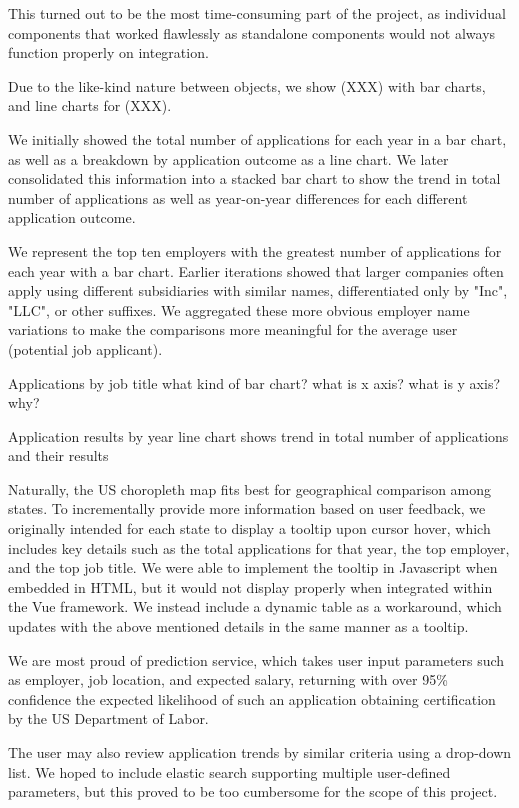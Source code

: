 \documentclass[sigconf]{acmart}
\begin{document}
This turned out to be the most time-consuming part of the project, as individual components that worked 
flawlessly as standalone components would not always function properly on integration. 


Due to the like-kind nature between objects, we show (XXX) with bar charts, and line charts for (XXX). 


We initially showed the total number of applications for each year in a bar chart, as well as a breakdown by application 
outcome as a line chart. We later consolidated this information into a stacked bar chart to show the trend in total number 
of applications as well as year-on-year differences for each different application outcome. 


We represent the top ten employers with the greatest number of applications for each year with a bar chart. 
Earlier iterations showed that larger companies often apply using different subsidiaries with similar names, 
differentiated only by "Inc", "LLC", or other suffixes. We aggregated these more obvious employer name variations 
to make the comparisons more meaningful for the average user (potential job applicant). 



Applications by job title 
what kind of bar chart? 
what is x axis? what is y axis? why?

Application results by year 
line chart 
shows trend in total number of applications and their results 



Naturally, the US choropleth map fits best for geographical comparison among states. To incrementally 
provide more information based on user feedback, we originally intended for each state to display a 
tooltip upon cursor hover, which includes key details such as the total applications for that year, the top employer, and the top 
job title. We were able to implement the tooltip in Javascript when embedded in HTML, but it would not display 
properly when integrated within the Vue framework. We instead include a dynamic table as a workaround, which updates with 
the above mentioned details in the same manner as a tooltip. 

We are most proud of prediction service, which takes user input parameters such as employer, job location, 
and expected salary, returning with over 95\% confidence the expected likelihood of such an application obtaining 
certification by the US Department of Labor. 

The user may also review application trends by similar criteria using a drop-down list. 
We hoped to include elastic search supporting multiple user-defined parameters, but this 
proved to be too cumbersome for the scope of this project. 
\end{document}
